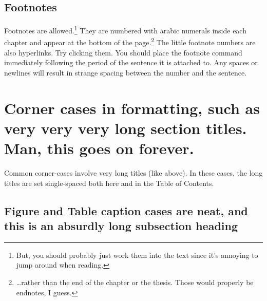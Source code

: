 \subsection{Footnotes}
Footnotes are allowed.\footnote{But, you should probably just work them into
the text since it's annoying to jump around when reading.} They are
numbered with arabic numerals inside each chapter and appear at the bottom
of the page.\footnote{\ldots rather than the end of the chapter or the
thesis.  Those would properly be endnotes, I guess.}  The little footnote
numbers are also hyperlinks.  Try clicking them.  You should place the
footnote command immediately following the period of the sentence it is
attached to.  Any spaces or newlines will result in strange spacing between
the number and the sentence.

\section{Corner cases in formatting, such as very very very long section titles.  Man, this goes on forever.}

Common corner-cases involve very long titles (like above).  In these cases,
the long titles are set single-spaced both here and in the Table of
Contents.

\subsection{Figure and Table caption cases are neat, and this is an absurdly
long subsection heading}
\label{sec:fig-tab}


